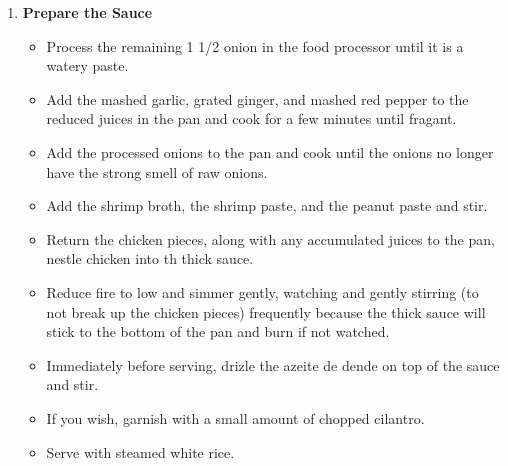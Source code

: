 \documentclass[11pt,letterpaper]{article}
\begin{document}
\begin{description}
\begin{enumerate}
        \item {\bf Prepare the Sauce}
	\begin{itemize}
        \item Process the remaining 1 1/2 onion in the food processor
          until it is a watery paste.
        \item Add the mashed garlic, grated ginger, and mashed red
          pepper to the reduced juices in the pan and cook for a few
          minutes until fragant.
        \item Add the processed onions to the pan and cook until the
          onions no longer have the strong smell of raw onions.
        \item Add the shrimp broth, the shrimp paste, and the peanut
          paste and stir.
        \item Return the chicken pieces, along with any accumulated
          juices to the pan, nestle chicken into th thick sauce.
        \item Reduce fire to low and simmer gently, watching and
          gently stirring (to not break up the chicken pieces)
          frequently because the thick sauce will stick to the bottom
          of the pan and burn if not watched.
        \item Immediately before serving, drizle the azeite de dende
          on top of the sauce and stir.
        \item If you wish, garnish with a small amount of chopped cilantro.
        \item Serve with steamed white rice.
        \end{itemize}
	\end{enumerate}         
\end{description}
\end{document}
